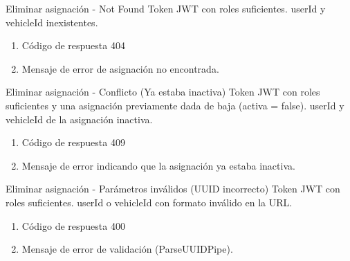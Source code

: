 {Eliminar asignación - Not Found}
{Token JWT con roles suficientes.}
{userId y vehicleId inexistentes.}
{\begin{enumerate} [leftmargin=*, nosep]
    \item Código de respuesta 404
    \item Mensaje de error de asignación no encontrada.
\end{enumerate}}

{Eliminar asignación - Conflicto (Ya estaba inactiva)}
{Token JWT con roles suficientes y una asignación previamente dada de baja (activa = false).}
{userId y vehicleId de la asignación inactiva.}
{\begin{enumerate} [leftmargin=*, nosep]
    \item Código de respuesta 409
    \item Mensaje de error indicando que la asignación ya estaba inactiva.
\end{enumerate}}

{Eliminar asignación - Parámetros inválidos (UUID incorrecto)}
{Token JWT con roles suficientes.}
{userId o vehicleId con formato inválido en la URL.}
{\begin{enumerate} [leftmargin=*, nosep]
    \item Código de respuesta 400
    \item Mensaje de error de validación (ParseUUIDPipe).
\end{enumerate}}

